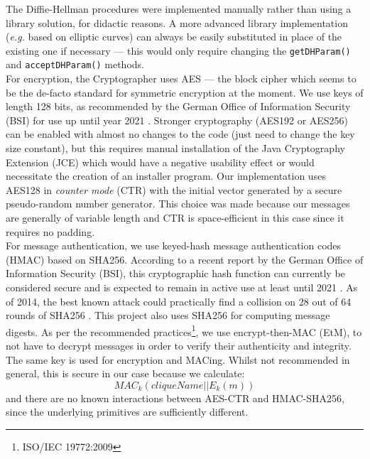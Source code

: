 \documentclass[a4paper, twoside, 12pt]{report}
\begin{document}
The Diffie-Hellman procedures were implemented manually rather than using a library solution, for didactic reasons. A more advanced library implementation (\textit{e.g.} based on elliptic curves) can always be easily substituted in place of the existing one if necessary --- this would only require changing the \texttt{getDHParam()} and \texttt{acceptDHParam()} methods. \\ 

For encryption, the Cryptographer uses AES --- the block cipher which seems to be the de-facto standard for symmetric encryption at the moment. We use keys of length 128 bits, as recommended by the German Office of Information Security (BSI) for use up until year 2021 \cite{margraf2016kryptographische}. Stronger cryptography (AES192 or AES256) can be enabled with almost no changes to the code (just need to change the key size constant), but this requires manual installation of the Java Cryptography Extension (JCE) which would have a negative usability effect or would necessitate the creation of an installer program. Our implementation uses AES128 in \emph{counter mode} (CTR) with the initial vector generated by a secure pseudo-random number generator. This choice was made because our messages are generally of variable length and CTR is space-efficient in this case since it requires no padding. \\

For message authentication, we use keyed-hash message authentication codes (HMAC) based on SHA256. According to a recent report by the German Office of Information Security (BSI), this cryptographic hash function can currently be considered secure and is expected to remain in active use at least until 2021 \cite{margraf2016kryptographische}. As of 2014, the best known attack could practically find a collision on 28 out of 64 rounds of SHA256 \cite{dobraunig2014analysis}. This project also uses SHA256 for computing message digests. As per the recommended practices\footnote{ISO/IEC 19772:2009}, we use encrypt-then-MAC (EtM), to not have to decrypt messages in order to verify their authenticity and integrity. \\

The same key is used for encryption and MACing. Whilst not recommended in general, this is secure in our case because we calculate:
\begin{equation*}
    MAC_k(cliqueName||E_k(m))
\end{equation*}
and there are no known interactions between AES-CTR and HMAC-SHA256, since the underlying primitives are sufficiently different.
\end{document}
